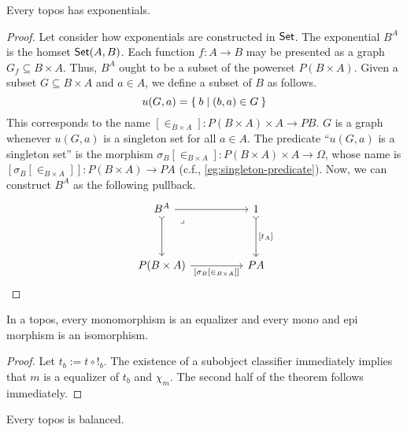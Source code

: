 \documentclass[article,10pt,oneside]{memoir}
\begin{document}
\begin{thm}\label{thm:topos-has-exponentials}
  Every topos has exponentials.
\end{thm}
\begin{proof}
  Let consider how exponentials are constructed in $\mathsf{Set}$.
  The exponential $B^{A}$ is the homset $\mathsf{Set}(A, B)$.
  Each function $f : A \to B$ may be presented as a graph $G_{f} \subseteq B \times A$.
  Thus, $B^{A}$ ought to be a subset of the powerset $P(B \times A)$.
  Given a subset $G \subseteq B \times A$ and $a \in A$, we define a subset of $B$ as follows.
  \[
    u(G, a) = \Set{b \mid (b, a) \in G}
  \]
  This corresponds to the name $[\in_{B \times A}] : P(B \times A) \times A \to PB$.
  $G$ is a graph whenever $u(G,a)$ is a singleton set for all $a \in A$.
  The predicate ``$u(G,a)$ is a singleton set'' is the morphism $\sigma_{B}[\in_{B \times A}] : P(B \times A) \times A \to \Omega$, whose name is $[\sigma_{B}[\in_{B \times A}]] : P(B \times A) \to PA$ (c.f., \cref{eg:singleton-predicate}).
  Now, we can construct $B^{A}$ as the following pullback.
  \[\begin{tikzcd}
      {B^{A}} && 1 \\
      \\
      {P(B \times A)} && PA
      \arrow[tail, from=1-1, to=3-1]
      \arrow["{[\sigma_{B}[\in_{B \times A}]]}"', from=3-1, to=3-3]
      \arrow["{[t_{A}]}", tail, from=1-3, to=3-3]
      \arrow[from=1-1, to=1-3]
      \arrow["\lrcorner"{anchor=center, pos=0.125}, draw=none, from=1-1, to=3-3]
    \end{tikzcd}\]
\end{proof}

\begin{thm}
  In a topos, every monomorphism is an equalizer and every mono and epi morphism is an isomorphism.
\end{thm}
\begin{proof}
  Let $t_{b} := t \circ !_{b}$.
  The existence of a subobject classifier immediately implies that $m$ is a equalizer of $t_{b}$ and $\chi_{m}$.
  The second half of the theorem follows immediately.
\end{proof}

\begin{cor}
  Every topos is balanced.
\end{cor}



\end{document}
